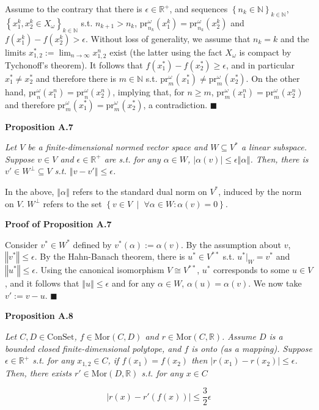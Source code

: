 \documentclass[a4paper]{article}
\newcommand{\Co}[1]{}
\newcommand{\AP}[1]{\left(#1\right)}
\newcommand{\AC}[1]{\left\{#1\right\}}
\newcommand{\ACM}[2]{\left\{#1\;\middle\vert\;#2\right\}}
\newcommand{\Abs}[1]{\left\vert #1 \right\vert}
\newcommand{\Norm}[1]{\left\Vert #1 \right\Vert}
\newcommand{\Nats}{\mathbb{N}}
\newcommand{\Reals}{\mathbb{R}}
\newcommand{\Mor}{\mathrm{Mor}}
\newcommand{\Lim}[1]{\lim_{#1 \rightarrow \infty}}
\newcommand{\Con}{{\boldsymbol{\mathrm{ConSet}}}}
\newcommand{\Prj}{\mathrm{pr}}
\newcommand{\Prjo}{\mathrm{pr}^\omega_n}
\begin{document}
Assume to the contrary that there is $\epsilon\in\Reals^+$, and sequences $\AC{n_k\in\Nats}_{k\in\Nats}$, $\AC{x_1^k,x_2^k\in X_\omega}_{k\in\Nats}$ s.t. $n_{k+1}>n_k$, $\Prj^\omega_{n_k}\AP{x_1^k}=\Prj^\omega_{n_k}\AP{x_2^k}$ and $f\AP{x_1^k}-f\AP{x_2^k}>\epsilon$. Without loss of generality, we assume that $n_k=k$ and the limits $x_{1,2}^*:=\Lim{n}x_{1,2}^n$ exist (the latter using the fact $X_\omega$ is compact by Tychonoff's theorem). It follows that $f\AP{x_1^*}-f\AP{x_2^*}\geq\epsilon$, and in particular $x_1^*\ne x_2^*$ and therefore there is $m\in\Nats$ s.t. $\Prj^\omega_m\AP{x_1^*}\ne\Prj^\omega_m\AP{x_2^*}$. On the other hand, $\Prjo\AP{x_1^n}=\Prjo\AP{x_2^n}$, implying that, for $n\geq m$, $\Prj^\omega_{m}\AP{x_1^n}=\Prj^\omega_{m}\AP{x_2^n}$ and therefore $\Prj^\omega_m\AP{x_1^*}=\Prj^\omega_m\AP{x_2^*}$, a contradiction. $\blacksquare$

\textbf{Proposition A.7}\Co{b}

\textit{Let $V$ be a finite-dimensional normed vector space and $W\subseteq V^*$ a linear subspace. Suppose $v\in V$ and $\epsilon\in\Reals^+$ are s.t. for any $\alpha\in W$, $\Abs{\alpha(v)} \leq \epsilon\Norm{\alpha}$. Then, there is $v'\in W^\bot\subseteq V$ s.t. $\Norm{v-v'}\leq\epsilon$.}\Co{i}

In the above, $\Norm{\alpha}$ refers to the standard dual norm on $V^*$, induced by the norm on $V$. $W^\bot$ refers to the set $\ACM{v\in V}{\forall\alpha\in W: \alpha(v)=0}$.

\textbf{Proof of Proposition A.7}\Co{b}

Consider $v^*\in W^*$ defined by $v^*(\alpha):=\alpha(v)$. By the assumption about $v$, $\Norm{v^*}\leq\epsilon$. By the Hahn-Banach theorem, there is $u^*\in V^{**}$ s.t. $u^*|_W=v^*$ and $\Norm{u^*}\leq\epsilon$. Using the canonical isomorphism $V\cong V^{**}$, $u^*$ corresponds to some $u\in V$, and it follows that $\Norm{u}\leq\epsilon$ and for any $\alpha\in W$, $\alpha(u)=\alpha(v)$. We now take $v':=v-u$. $\blacksquare$

\textbf{Proposition A.8}\Co{b}

\textit{Let $C,D\in\Con$, $f\in\Mor(C,D)$ and $r\in\Mor\AP{C,\Reals}$. Assume $D$ is a bounded closed finite-dimensional polytope, and $f$ is onto (as a mapping). Suppose $\epsilon\in\Reals^+$ s.t. for any $x_{1,2}\in C$, if $f\AP{x_1}=f\AP{x_2}$ then $\Abs{r\AP{x_1}-r\AP{x_2}} \leq \epsilon$. Then, there exists $r'\in\Mor\AP{D,\Reals}$ s.t. for any $x\in C$}\Co{i} 

$$\Abs{r\AP{x}-r'\AP{f(x)}} \leq \frac{3}{2}\epsilon$$
\end{document}

